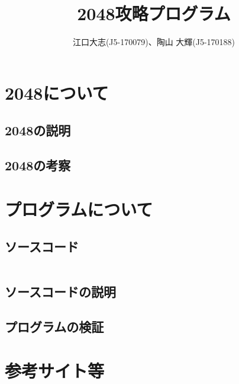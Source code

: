 \documentclass[11pt,a4paper]{jsarticle}
\title{2048攻略プログラム}
\author{江口大志(J5-170079)、陶山 大輝(J5-170188)}
\begin{document}
\maketitle
%

\section{2048について}
\subsection{2048の説明}
\noindent
\subsection{2048の考察}
\noindent


\section{プログラムについて}
\subsection{ソースコード}
\lstset{numbers=left}
\begin{lstlisting}

\end{lstlisting}
\subsection{ソースコードの説明}
\noindent
\subsection{プログラムの検証}
\noindent

\section{参考サイト等}
\noindent
\end{document}
